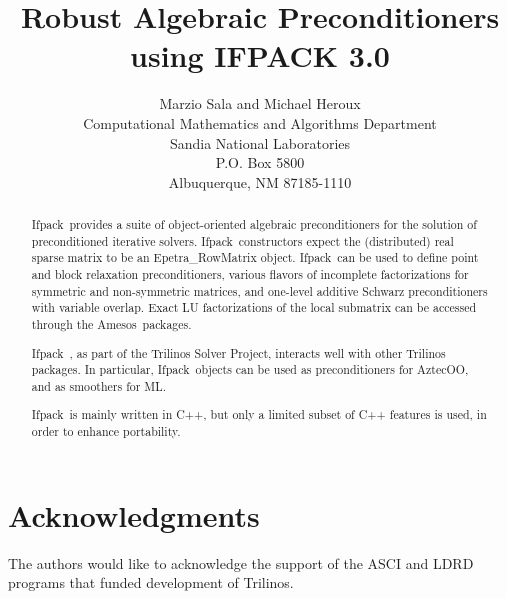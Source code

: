 \documentclass[11pt,relax]{SANDreport}
\author{Marzio Sala and Michael Heroux\\
Computational Mathematics and Algorithms Department \\
Sandia National Laboratories \\
P.O. Box 5800 \\
Albuquerque, NM 87185-1110
}
\title{Robust Algebraic Preconditioners using IFPACK 3.0}
\newcommand{\ifpack}{{\sc Ifpack}}
\newcommand{\aztecoo}{{\sc AztecOO}}
\newcommand{\amesos}{{\sc Amesos}}
\newcommand{\ml}{{\sc ML}}
\begin{document}
\maketitle

\begin{abstract}
\ifpack~provides a suite of object-oriented algebraic preconditioners
for the solution of preconditioned iterative solvers.  \ifpack~constructors 
expect the (distributed) real sparse matrix to be an Epetra\_RowMatrix object.
\ifpack\ can be used to define point and block relaxation preconditioners,
various flavors of incomplete factorizations for symmetric and non-symmetric
matrices, and one-level additive Schwarz preconditioners with variable
overlap. Exact LU factorizations of the local submatrix can be accessed through the \amesos\ packages.

\ifpack~, as part of the Trilinos Solver Project,
interacts well with other Trilinos packages. In particular, \ifpack~objects
can be used as preconditioners for \aztecoo, and as smoothers for \ml. 

\ifpack\ is mainly written in C++, but only  a limited subset of C++ features
is used, in order to enhance portability.
\end{abstract}

\clearpage
\section*{Acknowledgments}
The authors would like to acknowledge the support of the ASCI and LDRD programs
that funded development of Trilinos.

\medskip

\SANDmain

\tableofcontents

\clearpage
\newpage




\end{document}
